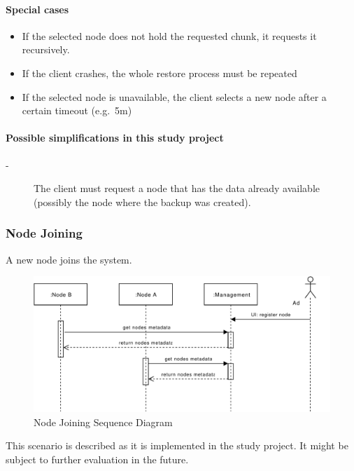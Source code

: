 \paragraph{Special cases}
\begin{itemize}
    \item If the selected node does not hold the requested chunk, it requests it recursively.
    \item If the client crashes, the whole restore process must be repeated
    \item If the selected node is unavailable, the client selects a new node after a certain timeout (e.g.\ 5m)
\end{itemize}

\paragraph{Possible simplifications in this study project}
\begin{description}
    \item[-] The client must request a node that has the data already available (possibly the node where the backup was created).
\end{description}


\subsubsection{Node Joining}\label{sec:scenario-node-join}
A new node joins the system.

\begin{figure}[h]
    \centering
    \includegraphics[width=\linewidth]{resources/node_joining.pdf}
    \caption{Node Joining Sequence Diagram}
    \label{fig:node-joining}
\end{figure}

This scenario is described as it is implemented in the study project. It might be subject to further evaluation in the future.

